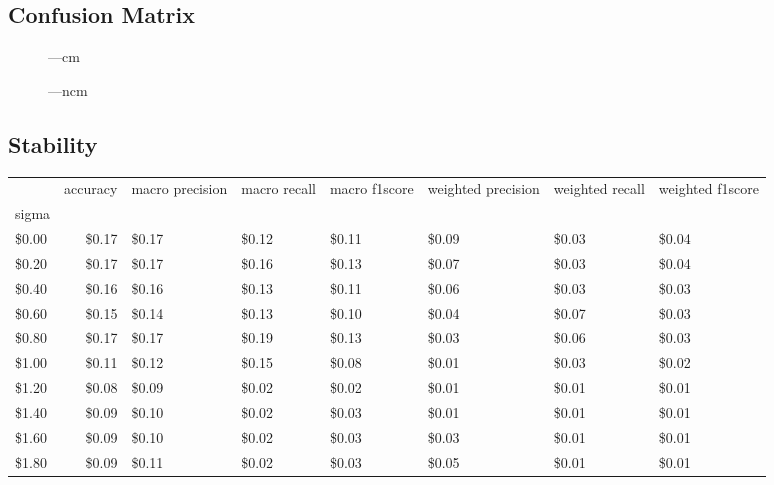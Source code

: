 \documentclass[11pt]{article}
\begin{document}
\subsection{Confusion Matrix}
\begin{figure}[H]
    \centering
    ---cm
\end{figure}
\begin{figure}[H]
    \centering
    ---ncm
\end{figure}
\subsection{Stability}
\begin{table}[H]
    \centering
    \begin{tabular}{lrp{1.3cm}p{1.3cm}p{1.3cm}p{1.3cm}p{1.3cm}p{1.3cm}}
        \toprule
        {} &  accuracy &  macro precision &  macro recall &  macro f1score &  weighted precision &  weighted recall &  weighted f1score \\
        sigma &           &                  &               &                &                     &                  &                   \\
        \midrule
        \$0.00 &     \$0.17 &            \$0.17 &         \$0.12 &          \$0.11 &               \$0.09 &            \$0.03 &             \$0.04 \\
        \$0.20 &     \$0.17 &            \$0.17 &         \$0.16 &          \$0.13 &               \$0.07 &            \$0.03 &             \$0.04 \\
        \$0.40 &     \$0.16 &            \$0.16 &         \$0.13 &          \$0.11 &               \$0.06 &            \$0.03 &             \$0.03 \\
        \$0.60 &     \$0.15 &            \$0.14 &         \$0.13 &          \$0.10 &               \$0.04 &            \$0.07 &             \$0.03 \\
        \$0.80 &     \$0.17 &            \$0.17 &         \$0.19 &          \$0.13 &               \$0.03 &            \$0.06 &             \$0.03 \\
        \$1.00 &     \$0.11 &            \$0.12 &         \$0.15 &          \$0.08 &               \$0.01 &            \$0.03 &             \$0.02 \\
        \$1.20 &     \$0.08 &            \$0.09 &         \$0.02 &          \$0.02 &               \$0.01 &            \$0.01 &             \$0.01 \\
        \$1.40 &     \$0.09 &            \$0.10 &         \$0.02 &          \$0.03 &               \$0.01 &            \$0.01 &             \$0.01 \\
        \$1.60 &     \$0.09 &            \$0.10 &         \$0.02 &          \$0.03 &               \$0.03 &            \$0.01 &             \$0.01 \\
        \$1.80 &     \$0.09 &            \$0.11 &         \$0.02 &          \$0.03 &               \$0.05 &            \$0.01 &             \$0.01 \\
        \bottomrule
        \end{tabular}
        
\end{table}  
\end{document}
